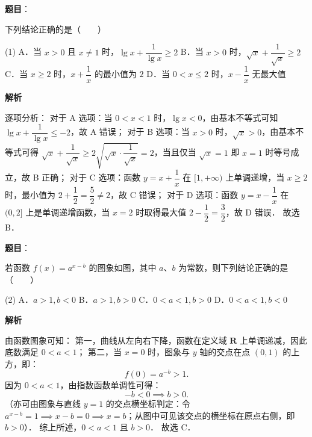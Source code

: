 \begin{answer}

\textbf{题目}：

下列结论正确的是\mbox{（　　）}

\begin{gkopts}(1)
\task A．当 $x > 0$ 且 $x \neq 1$ 时，$\lg x + \dfrac{1}{\lg x} \geqslant 2$
\task B．当 $x > 0$ 时，$\sqrt{x} + \dfrac{1}{\sqrt{x}} \geqslant 2$
\task C．当 $x \geqslant 2$ 时，$x + \dfrac{1}{x}$ 的最小值为 $2$
\task D．当 $0 < x \leqslant 2$ 时，$x - \dfrac{1}{x}$ 无最大值
\end{gkopts}

\textbf{解析}

逐项分析：
对于 A 选项：当 $0 < x < 1$ 时，$\lg x < 0$，由基本不等式可知 $\lg x + \dfrac{1}{\lg x} \leqslant -2$，故 A 错误；
对于 B 选项：当 $x > 0$ 时，$\sqrt{x} > 0$，由基本不等式可得 $\sqrt{x} + \dfrac{1}{\sqrt{x}} \geqslant 2\sqrt{\sqrt{x} \cdot \dfrac{1}{\sqrt{x}}} = 2$，当且仅当 $\sqrt{x} = 1$ 即 $x = 1$ 时等号成立，故 B 正确；
对于 C 选项：函数 $y = x + \dfrac{1}{x}$ 在 $[1, +\infty)$ 上单调递增，当 $x \geqslant 2$ 时，最小值为 $2 + \dfrac{1}{2} = \dfrac{5}{2} \neq 2$，故 C 错误；
对于 D 选项：函数 $y = x - \dfrac{1}{x}$ 在 $(0, 2]$ 上是单调递增函数，当 $x = 2$ 时取得最大值 $2 - \dfrac{1}{2} = \dfrac{3}{2}$，故 D 错误．
故选 B．


\end{answer}
\begin{answer}

\textbf{题目}：

若函数 $f(x) = a^{x-b}$ 的图象如图，其中 $a$、$b$ 为常数，则下列结论正确的是\mbox{（　　）}
\nopagebreak[4]
\begin{center}\end{center}
\nopagebreak[4]
\begin{gkopts}(2)
\task A．$a > 1, b < 0$
\task B．$a > 1, b > 0$
\task C．$0 < a < 1, b > 0$
\task D．$0 < a < 1, b < 0$
\end{gkopts}

\textbf{解析}

由函数图象可知：
第一，曲线从左向右下降，函数在定义域 $\mathbf{R}$ 上单调递减，因此底数满足 $0 < a < 1$；
第二，当 $x = 0$ 时，图象与 $y$ 轴的交点在点 $(0, 1)$ 的上方，即：
\nopagebreak[4]
\[
f(0) = a^{-b} > 1.
\]
因为 $0 < a < 1$，由指数函数单调性可得：
\nopagebreak[4]
\[
-b < 0 \implies b > 0.
\]
（亦可由图象与直线 $y = 1$ 的交点横坐标判定：令 $a^{x-b} = 1 \implies x - b = 0 \implies x = b$；从图中可见该交点的横坐标在原点右侧，即 $b > 0$）．
综上所述，$0 < a < 1$ 且 $b > 0$．
故选 C．


\end{answer}
